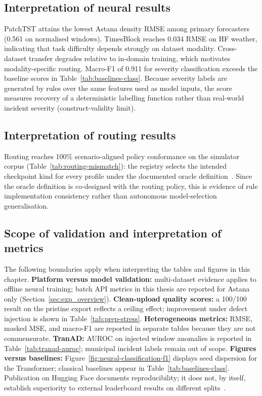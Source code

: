 \subsection{Interpretation of neural results}

PatchTST attains the lowest Astana density RMSE among primary forecasters (0.561 on normalised windows). TimesBlock reaches 0.034 RMSE on HF weather, indicating that task difficulty depends strongly on dataset modality. Cross-dataset transfer degrades relative to in-domain training, which motivates modality-specific routing. Macro-F1 of 0.911 for severity classification exceeds the baseline scores in Table~\ref{tab:baselines-class}. Because severity labels are generated by rules over the same features used as model inputs, the score measures recovery of a deterministic labelling function rather than real-world incident severity (construct-validity limit).

\subsection{Interpretation of routing results}

Routing reaches 100\% scenario-aligned policy conformance on the simulator corpus (Table~\ref{tab:routing-mismatch}): the registry selects the intended checkpoint kind for every profile under the documented oracle definition~\cite{bakytuly2026microservices}. Since the oracle definition is co-designed with the routing policy, this is evidence of rule implementation consistency rather than autonomous model-selection generalisation.

\subsection{Scope of validation and interpretation of metrics}

The following boundaries apply when interpreting the tables and figures in this chapter. \textbf{Platform versus model validation:} multi-dataset evidence applies to offline neural training; batch API metrics in this thesis are reported for Astana only (Section~\ref{sec:exp_overview}). \textbf{Clean-upload quality scores:} a 100/100 result on the pristine export reflects a ceiling effect; improvement under defect injection is shown in Table~\ref{tab:prep-stress}. \textbf{Heterogeneous metrics:} RMSE, masked MSE, and macro-F1 are reported in separate tables because they are not commensurate. \textbf{TranAD:} AUROC on injected window anomalies is reported in Table~\ref{tab:tranad-auroc}; municipal incident labels remain out of scope. \textbf{Figures versus baselines:} Figure~\ref{fig:neural-classification-f1} displays seed dispersion for the Transformer; classical baselines appear in Table~\ref{tab:baselines-class}. Publication on Hugging Face documents reproducibility; it does not, by itself, establish superiority to external leaderboard results on different splits~\cite{nie2023patchtst,yu2018stgcn}.

